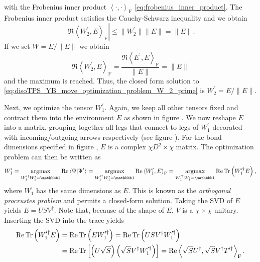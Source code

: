with the Frobenius inner product $\left\langle \cdot, \cdot \right\rangle_\text{F}$ \eqref{eq:frobenius_inner_product}. The Frobenius inner product satisfies the Cauchy-Schwarz inequality and we obtain
\begin{equation}
	\left|\Re\left\langle W_2^\prime, E \right\rangle_\text{F}\right| \le \lVert W_2^\prime\rVert\lVert E\rVert = \lVert E\rVert.
\end{equation}
If we set $W = E/\lVert E\rVert$ we obtain
\begin{equation}
	\Re\left\langle W_2^\prime, E \right\rangle_\text{F} = \frac{\Re\left\langle E^\prime, E \right\rangle_\text{F}}{\lVert E\rVert} = \lVert E\rVert
\end{equation}
and the maximum is reached. Thus, the closed form solution to \eqref{eq:disoTPS_YB_move_optimization_problem_W_2_prime} is $W_2^\prime = E/\lVert E\rVert$. \par
Next, we optimize the tensor $W_1^\prime$. Again, we keep all other tensors fixed and contract them into the environment $E$ as shown in figure . We now reshape $E$ into a matrix, grouping together all legs that connect to legs of $W_1^\prime$ decorated with incoming/outgoing arrows respectively (see figure ). For the bond dimensions specified in figure , $E$ is a complex $\chi D^2 \times \chi$ matrix. The optimization problem can then be written as
\begin{equation}
	\label{eq:disoTPS_YB_move_optimization_problem_W_1_prime}
	W_1^\prime = \underset{W_1^{\prime\dagger}W_1^\prime = \id}{\text{argmax}}\Re\left\langle\Psi\middle|\Psi^\prime\right\rangle = \underset{W_1^{\prime\dagger}W_1^\prime = \id}{\text{argmax}} \Re\left\langle W_1^\prime, E \right\rangle_\text{F} = \underset{W_1^{\prime\dagger}W_1^\prime = \id}{\text{argmax}} \Re\Tr\left(W_1^{\prime\dagger}E\right),
\end{equation}
where $W_1^\prime$ has the same dimensions as $E$. This is known as the \textit{orthogonal procrustes problem} and permits a closed-form solution.  Taking the SVD of $E$ yields $E = USV^\dagger$. Note that, because of the shape of $E$, $V$ is a $\chi\times\chi$ unitary. Inserting the SVD into the trace yields
\begin{equation}
	\begin{split}
	\operatorname{Re}\operatorname{Tr}\left(W_1^{\prime\dagger}E\right) &= \operatorname{Re}\operatorname{Tr}\left(E W_1^{\prime\dagger}\right) = \operatorname{Re}\operatorname{Tr}\left(USV^\dagger W_1^{\prime\dagger}\right)\\
	&= \operatorname{Re}\operatorname{Tr}\left[\left(U\sqrt{S}\right)\left(\sqrt{S}V^\dagger W_1^{\prime\dagger}\right)\right] = \operatorname{Re}\left\langle\sqrt{S}U^\dagger,\sqrt{S}V^\dagger T^{\prime\dagger}\right\rangle_\text{F}.
	\end{split}
\end{equation}
